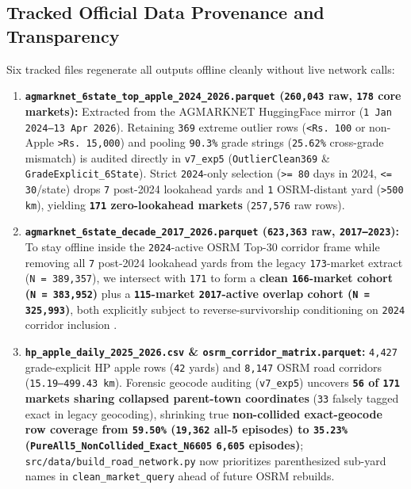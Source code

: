 \documentclass[11pt,a4paper]{article}
\begin{document}
\subsection{Tracked Official Data Provenance and Transparency}

Six tracked files regenerate all outputs offline cleanly without live network calls:

\begin{enumerate}
  \item \textbf{\texttt{agmarknet\_6state\_top\_apple\_2024\_2026.parquet} (\texttt{260,043} raw, \texttt{178} core markets):} Extracted from the AGMARKNET HuggingFace mirror (\texttt{1 Jan 2024--13 Apr 2026}). Retaining \texttt{369} extreme outlier rows (\texttt{<Rs.\,100} or non-Apple \texttt{>Rs.\,15,000}) and pooling \texttt{90.3\%} grade strings (\texttt{25.62\%} cross-grade mismatch) is audited directly in \texttt{v7\_exp5} (\texttt{OutlierClean369} \& \texttt{GradeExplicit\_6State}). Strict \texttt{2024}-only selection (\texttt{>= 80} days in 2024, \texttt{<= 30}/state) drops \texttt{7} post-2024 lookahead yards and \texttt{1} OSRM-distant yard (\texttt{>500 km}), yielding \textbf{\texttt{171} zero-lookahead markets} (\texttt{257,576} raw rows).
  \item \textbf{\texttt{agmarknet\_6state\_decade\_2017\_2026.parquet} (\texttt{623,363} raw, \texttt{2017--2023}):} To stay offline inside the \texttt{2024}-active OSRM Top-30 corridor frame while removing all \texttt{7} post-2024 lookahead yards from the legacy \texttt{173}-market extract (\texttt{N = 389,357}), we intersect with \texttt{171} to form a \textbf{clean \texttt{166}-market cohort (\texttt{N = 383,952})} plus a \textbf{\texttt{115}-market \texttt{2017}-active overlap cohort (\texttt{N = 325,993})}, both explicitly subject to reverse-survivorship conditioning on \texttt{2024} corridor inclusion \citep{sparks2018nasapower}.
  \item \textbf{\texttt{hp\_apple\_daily\_2025\_2026.csv} \& \texttt{osrm\_corridor\_matrix.parquet}:} \texttt{4,427} grade-explicit HP apple rows (\texttt{42} yards) and \texttt{8,147} OSRM road corridors (\texttt{15.19--499.43 km}). Forensic geocode auditing (\texttt{v7\_exp5}) uncovers \textbf{\texttt{56} of \texttt{171} markets sharing collapsed parent-town coordinates} (\texttt{33} falsely tagged exact in legacy geocoding), shrinking true \textbf{non-collided exact-geocode row coverage from \texttt{59.50\%} (\texttt{19,362} all-5 episodes) to \texttt{35.23\%} (\texttt{PureAll5\_NonCollided\_Exact\_N6605} \texttt{6,605} episodes)}; \texttt{src/data/build\_road\_network.py} now prioritizes parenthesized sub-yard names in \texttt{clean\_market\_query} ahead of future OSRM rebuilds.

\end{enumerate}
\end{document}
